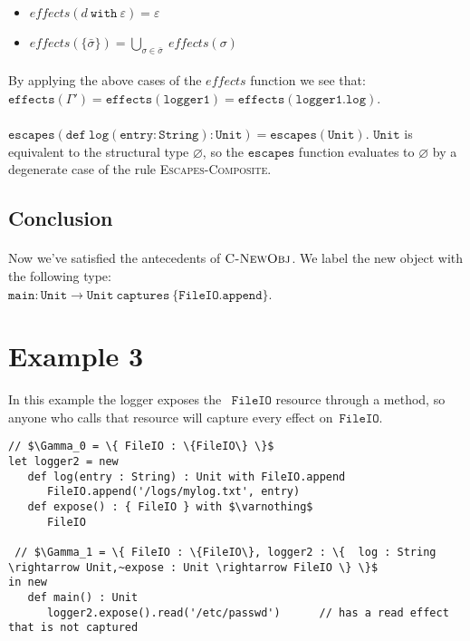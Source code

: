 \documentclass{llncs}
\newcommand{\keywadj}[1]{\mathtt{#1}}
\newcommand{\keyw}[1]{\keywadj{#1}~}
\begin{document}
\begin{itemize}
	\item $effects(d~\keyw{with} \varepsilon) = \varepsilon$
	\item $effects(\{\bar \sigma\}) = \bigcup_{\sigma \in \bar \sigma}~effects(\sigma)$
\end{itemize}

\paragraph{}
By applying the above cases of the $effects$ function we see that:\\
$\keywadj{effects(\Gamma') = effects(logger1) = effects(logger1.log)}$.

\paragraph{}
$\keywadj{escapes(def~log(entry : String) : Unit) = escapes(Unit)}$.  $\keywadj{Unit}$ is equivalent to the structural type $\varnothing$, so the $\keywadj{escapes}$ function evaluates to $\varnothing$ by a degenerate case of the rule \textsc{Escapes-Composite}.

\subsection*{Conclusion}

\paragraph{}
Now we've satisfied the antecedents of $\textsc{C-NewObj}$. We label the new object with the following type:\\
$\keywadj{ main : Unit \rightarrow Unit~captures~\{ FileIO.append \} }$.

\section{Example 3}

In this example the logger exposes the ~$\keywadj{FileIO}$ resource through a method, so anyone who calls that resource will capture every effect on~$\keywadj{FileIO}$.\\

\vspace{-6pt}
\begin{lstlisting}[xleftmargin=20pt]
// $\Gamma_0 = \{ FileIO : \{FileIO\} \}$
let logger2 = new
   def log(entry : String) : Unit with FileIO.append
      FileIO.append('/logs/mylog.txt', entry)
   def expose() : { FileIO } with $\varnothing$
      FileIO
      
 // $\Gamma_1 = \{ FileIO : \{FileIO\}, logger2 : \{  log : String \rightarrow Unit,~expose : Unit \rightarrow FileIO \} \}$
in new
   def main() : Unit
      logger2.expose().read('/etc/passwd')		// has a read effect that is not captured
\end{lstlisting}
\end{document}
